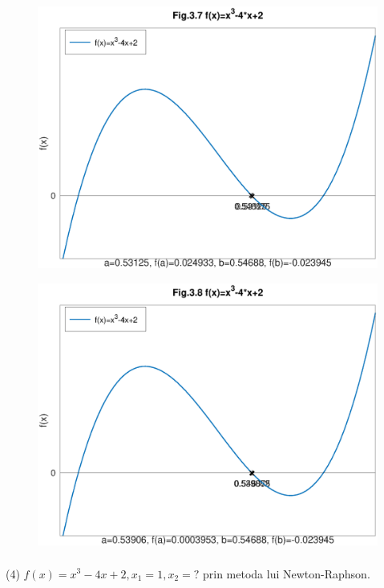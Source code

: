 \documentclass[12pt]{article}
\begin{document}
\begin{figure}[htbp]
    \begin{center}
        \includegraphics[height=90mm]{octave-fig/Fig.3.7.eps}
        \includegraphics[height=90mm]{octave-fig/Fig.3.8.eps}
    \end{center}
\end{figure}
\newpage

(4) $f(x)=x^3-4x+2, x_1=1, x_2= ?$ prin metoda lui Newton-Raphson.\\
\end{document}
